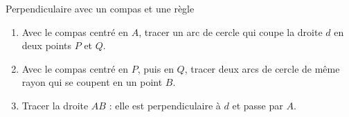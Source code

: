 %

\begin{astuce}{Perpendiculaire avec un compas et une règle}
\begin{enumerate}[leftmargin=*, itemsep=2pt, topsep=2pt]
    \item Avec le compas centré en $A$, tracer un arc de cercle qui coupe la droite $d$ en deux points $P$ et $Q$.
    \item Avec le compas centré en $P$, puis en $Q$, tracer deux arcs de cercle de même rayon qui se coupent en un point $B$.
    \item Tracer la droite $AB$ : elle est perpendiculaire à $d$ et passe par $A$.
\end{enumerate}
\end{astuce}

